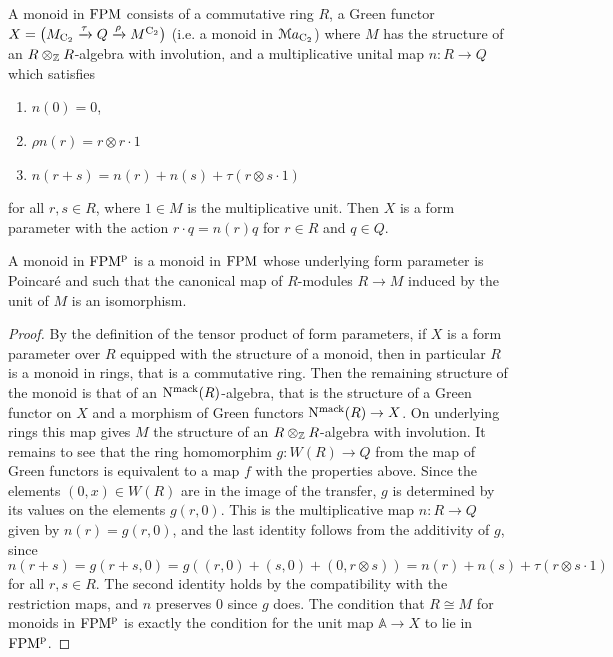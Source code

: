 \begin{lemma}%
\label{lemma:monoidsFPM}%
A monoid in $\mathrm {FPM}$ consists of a commutative ring $R$, a Green functor $
X=\big(M_{\mathrm{C_2}}\xrightarrow{\tau}Q\xrightarrow{\rho}M^{\mathrm{C_2}}\big)
$  (i.e. a monoid in $\mathcal{M}a_{\mathrm{C_2}}$)
where $M$ has the structure of an $R\otimes_{\mathbb{Z}} R$-algebra with involution, and a multiplicative unital map $n\colon R\to Q$ which satisfies 
\begin{enumerate}
\item $n(0)=0$,
\item $\rho n(r)=r\otimes r\cdot 1$
\item $n(r+s)=n(r)+n(s)+\tau(r\otimes s\cdot 1)$
\end{enumerate}
for all $r,s\in R$, where $1\in M$ is the multiplicative unit. Then $X$ is a form parameter with the action $r\cdot q=n(r)q$ for $r\in R$ and $q\in Q$. 

A monoid in $\mathrm {FPM}^{\mathrm p}$ is a monoid in $\mathrm {FPM}$ whose underlying form parameter is Poincar\'e and such that the canonical map of $R$-modules $R\to M$ induced by the unit of $M$ is an isomorphism.
\end{lemma}

\begin{proof}
By the definition of the tensor product of form parameters, if $X$ is a form parameter over $R$ equipped with the structure of a monoid, then in particular $R$ is a monoid in rings, that is a commutative ring. Then the remaining structure of the monoid is that of an $\mathrm{N}^{\mathrm{mack}}(R)$-algebra, that is the structure of a Green functor on $X$ and a morphism of Green functors $\mathrm{N}^{\mathrm{mack}}(R)\to X$. On underlying rings this map gives $M$ the structure of an $R\otimes_{\mathbb{Z}} R$-algebra with involution. It remains to see that the ring homomorphim $g\colon W(R)\to Q$ from the map of Green functors is equivalent to a map $f$ with the properties above. 
Since the elements $(0,x)\in W(R)$ are in the image of the transfer, $g$ is determined by its values on the elements $g(r,0)$. This is the multiplicative map $n\colon R\to Q$ given by $n(r)=g(r,0)$, and the last identity follows from the additivity of $g$, since
\[
n(r+s)=g(r+s,0)=g((r,0)+(s,0)+(0,r\otimes s))=n(r)+n(s)+\tau(r\otimes s\cdot 1)
\]
for all $r,s\in R$. The second identity holds by the compatibility with the restriction maps, and $n$ preserves $0$ since $g$ does.
The condition that $R\cong M$ for monoids in $\mathrm {FPM}^{\mathrm p}$ is exactly the condition for the unit map $\mathbb{A}\to X$ to lie in $\mathrm {FPM}^{\mathrm p}$.
\end{proof}




